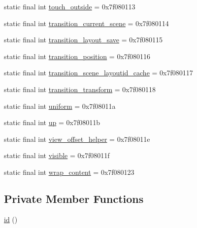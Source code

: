 \begin{DoxyCompactItemize}
\item 
static final int \mbox{\hyperlink{classandroid_1_1support_1_1design_1_1_r_1_1id_ab8211b0d7277775cf8c214969d03915e}{touch\+\_\+outside}} = 0x7f080113
\item 
static final int \mbox{\hyperlink{classandroid_1_1support_1_1design_1_1_r_1_1id_a75728c7ae11fb924149bcd39c4f7f843}{transition\+\_\+current\+\_\+scene}} = 0x7f080114
\item 
static final int \mbox{\hyperlink{classandroid_1_1support_1_1design_1_1_r_1_1id_ae07562594f75d7b832f160869fe9432f}{transition\+\_\+layout\+\_\+save}} = 0x7f080115
\item 
static final int \mbox{\hyperlink{classandroid_1_1support_1_1design_1_1_r_1_1id_af03e341e1ccf6730fff343b035efc176}{transition\+\_\+position}} = 0x7f080116
\item 
static final int \mbox{\hyperlink{classandroid_1_1support_1_1design_1_1_r_1_1id_adf45e834c51610a398a2fc8655464d2a}{transition\+\_\+scene\+\_\+layoutid\+\_\+cache}} = 0x7f080117
\item 
static final int \mbox{\hyperlink{classandroid_1_1support_1_1design_1_1_r_1_1id_ade83b753c44146d78866b5f544249143}{transition\+\_\+transform}} = 0x7f080118
\item 
static final int \mbox{\hyperlink{classandroid_1_1support_1_1design_1_1_r_1_1id_afd2d95e460620b888ef95af5d6a2f47b}{uniform}} = 0x7f08011a
\item 
static final int \mbox{\hyperlink{classandroid_1_1support_1_1design_1_1_r_1_1id_a1a22501200657ffeeaa195ac9fd5db8e}{up}} = 0x7f08011b
\item 
static final int \mbox{\hyperlink{classandroid_1_1support_1_1design_1_1_r_1_1id_a444601de1ff3abd16c891e62ecd7692a}{view\+\_\+offset\+\_\+helper}} = 0x7f08011e
\item 
static final int \mbox{\hyperlink{classandroid_1_1support_1_1design_1_1_r_1_1id_a8ae9495679191ce8aa5c91e0c5d11460}{visible}} = 0x7f08011f
\item 
static final int \mbox{\hyperlink{classandroid_1_1support_1_1design_1_1_r_1_1id_a6e8a85590f5382de4d0dfabf2d8919be}{wrap\+\_\+content}} = 0x7f080123
\end{DoxyCompactItemize}
\subsection*{Private Member Functions}
\begin{DoxyCompactItemize}
\item 
\mbox{\hyperlink{classandroid_1_1support_1_1design_1_1_r_1_1id_a50ff9c45db6e42295d0d7771e50055f7}{id}} ()
\end{DoxyCompactItemize}


